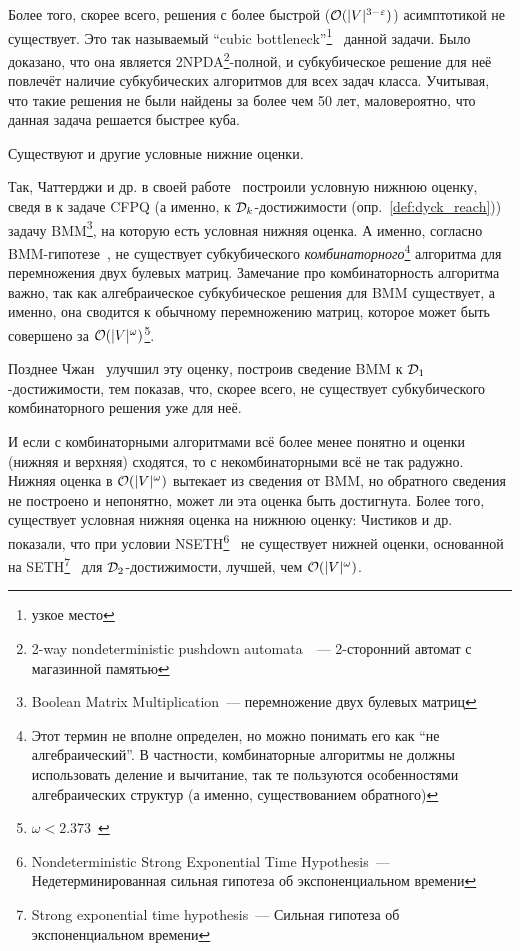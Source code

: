 Более того, скорее всего, решения с более быстрой ($\mathcal{O}(|V|^{3 - \varepsilon})$) асимптотикой не существует. Это так называемый ``cubic bottleneck''\footnote{узкое место}~\cite{Heintze1997} данной задачи. Было доказано, что она является 2NPDA\footnote{2-way nondeterministic pushdown automata~\cite{Aho1968}~--- 2-сторонний автомат с магазинной памятью}-полной, и субкубическое решение для неё повлечёт наличие субкубических алгоритмов для всех задач класса. Учитывая, что такие решения не были найдены за более чем 50 лет, маловероятно, что данная задача решается быстрее куба. 

Существуют и другие условные нижние оценки. 

Так, Чаттерджи и др. в своей работе~\cite{Chatterjee17} построили условную нижнюю оценку, сведя в к задаче CFPQ (а именно, к $\mathcal{D}_k$-достижимости (опр.~\ref{def:dyck_reach})) задачу BMM\footnote{Boolean Matrix Multiplication~--- перемножение двух булевых матриц}, на которую есть условная нижняя оценка. А именно, согласно BMM-гипотезе~\cite{Williams18}, не существует субкубического \textit{комбинаторного}\footnote{Этот термин не вполне определен, но можно понимать его как ``не алгебраический''. В частности, комбинаторные алгоритмы не должны использовать деление и вычитание, так те пользуются особенностями алгебраических структур (а именно, существованием обратного)} алгоритма для перемножения двух булевых матриц. Замечание про комбинаторность алгоритма важно, так как алгебраическое субкубическое решения для BMM существует, а именно, она сводится к обычному перемножению матриц, которое может быть совершено за $\mathcal{O}(|V|^{\omega})$\footnote{$\omega < 2.373$~\cite{Alman20}}.

Позднее Чжан~\cite{Zhang20} улучшил эту оценку, построив сведение BMM к $\mathcal{D}_1$-достижимости, тем показав, что, скорее всего, не существует субкубического комбинаторного решения уже для неё. 

И если с комбинаторными алгоритмами всё более менее понятно и оценки (нижняя и верхняя) сходятся, то с некомбинаторными всё не так радужно. Нижняя оценка в $\mathcal{O}(|V|^{\omega})$ вытекает из сведения от BMM, но обратного сведения не построено и непонятно, может ли эта оценка быть достигнута. Более того, существует условная нижняя оценка на нижнюю оценку: Чистиков и др.~\cite{Chistikov21} показали, что при условии NSETH\footnote{Nondeterministic Strong Exponential Time Hypothesis~--- Недетерминированная сильная гипотеза об экспоненциальном времени}~\cite{Carmosino16} не существует нижней оценки, основанной на SETH\footnote{Strong exponential time hypothesis~--- Сильная гипотеза об экспоненциальном времени}~\cite{Impagliazzo01} для $\mathcal{D}_2$-достижимости, лучшей, чем $\mathcal{O}(|V|^{\omega})$.

